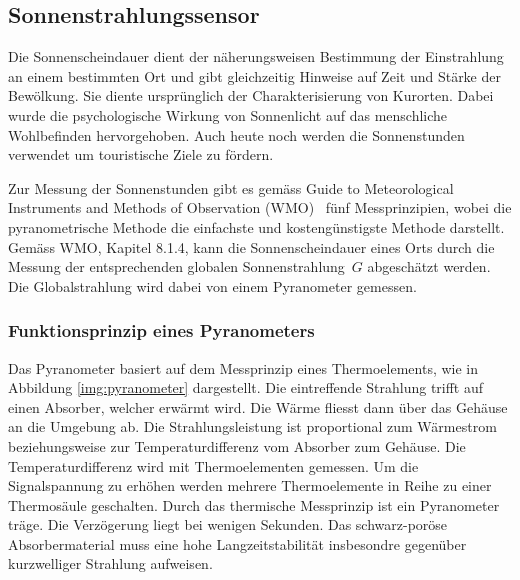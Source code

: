 \subsection{Sonnenstrahlungssensor}
Die Sonnenscheindauer dient der näherungsweisen Bestimmung der Einstrahlung an einem bestimmten Ort und gibt gleichzeitig Hinweise auf Zeit und Stärke der Bewölkung. Sie diente ursprünglich der Charakterisierung von Kurorten. Dabei wurde die psychologische Wirkung von Sonnenlicht auf das menschliche Wohlbefinden hervorgehoben. Auch heute noch werden die Sonnenstunden verwendet um touristische Ziele zu fördern.

\noindent
Zur Messung der Sonnenstunden gibt es gemäss \flqq Guide to Meteorological Instruments and Methods of Observation (WMO)\frqq ~\cite{WMO2014Gtmi} fünf Messprinzipien, wobei die pyranometrische Methode die einfachste und kostengünstigste Methode darstellt. Gemäss WMO, Kapitel 8.1.4, kann die Sonnenscheindauer eines Orts durch die Messung der entsprechenden globalen Sonnenstrahlung\ $G$ abgeschätzt werden. Die Globalstrahlung wird dabei von einem Pyranometer gemessen.

\subsubsection{Funktionsprinzip eines Pyranometers}
Das Pyranometer basiert auf dem Messprinzip eines Thermoelements, wie in Abbildung \ref{img:pyranometer}  dargestellt. Die eintreffende Strahlung trifft auf einen Absorber, welcher erwärmt wird. Die Wärme fliesst dann über das Gehäuse an die Umgebung ab. Die Strahlungsleistung ist proportional zum Wärmestrom beziehungsweise zur Temperaturdifferenz vom Absorber zum Gehäuse. Die Temperaturdifferenz wird mit Thermoelementen gemessen. Um die Signalspannung zu erhöhen werden mehrere Thermoelemente in Reihe zu einer Thermosäule geschalten. Durch das thermische Messprinzip ist ein Pyranometer träge. Die Verzögerung liegt bei wenigen Sekunden. Das schwarz-poröse Absorbermaterial muss eine hohe Langzeitstabilität insbesondre gegenüber kurzwelliger Strahlung aufweisen.

